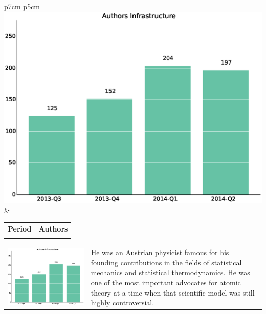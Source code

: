 \documentclass[a4wide,11pt]{report}
\begin{document}
\begin{tabular}{p{7cm} p{5cm}}
    \vspace{0pt} 
    \includegraphics[scale=.35]{figs/authorsInfrastructure.eps}
    & 
    \vspace{0pt}
    \begin{tabular}{l|l}%
    \bfseries Period & \bfseries Authors %
    \csvreader[head to column names]{data/authorsInfrastructure.csv}{}%
    {\\ & \authors}
    \end{tabular}
\end{tabular}

\begin{tabular}{p{7cm} p{5cm}}
    \vspace{0pt} 
    \includegraphics[scale=.35]{figs/authorsInfrastructure.eps}
    & 
    \vspace{0pt}
    He was an Austrian physicist famous for his founding contributions in the fields of
    statistical mechanics and statistical thermodynamics. He was one of the most
    important advocates for atomic theory at a time when that scientific model was 
    still highly controversial.\\
\end{tabular}
\end{document}
